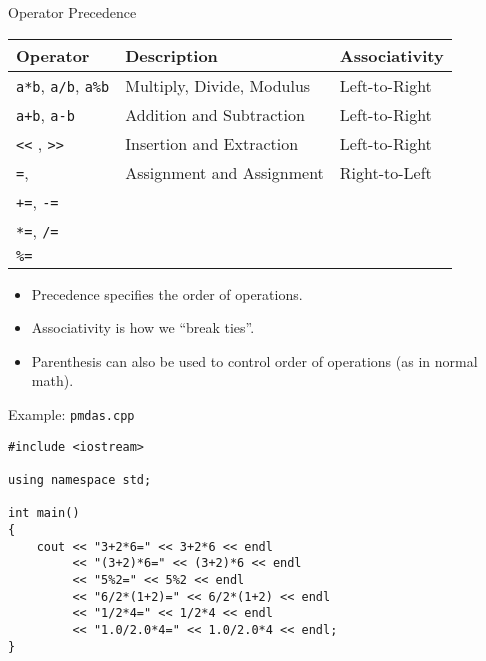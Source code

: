 \documentclass[]{beamer}
\begin{document}
\begin{frame}{Operator Precedence}
    \begin{tabular}{|l|l|l|}
        \hline
        \textbf{Operator} & \textbf{Description} & \textbf{Associativity} \\
        \hline
        \texttt{a*b}, \texttt{a/b}, \texttt{a\%b} & Multiply, Divide, Modulus & Left-to-Right\\
        \hline
        \texttt{a+b}, \texttt{a-b} & Addition and Subtraction & Left-to-Right\\
        \hline
        \texttt{<<} , \texttt{>>} & Insertion and Extraction & Left-to-Right \\
        \hline
        \texttt{=},  & Assignment and Assignment & Right-to-Left \\
        \texttt{+=}, \texttt{-=} & & \\
        \texttt{*=}, \texttt{/=} & & \\
        \texttt{\%=} & & \\
        \hline
    \end{tabular}

    \begin{itemize}[<+->]
        \item Precedence specifies the order of operations.
        \item Associativity is how we ``break ties''.
        \item Parenthesis can also be used to control order of
            operations (as in normal math).
    \end{itemize}
\end{frame}


\begin{frame}[fragile]{Example: \texttt{pmdas.cpp}}
    \begin{adjustbox}{max height=0.8\textheight}
    \begin{BVerbatim}
#include <iostream>

using namespace std;

int main()
{
    cout << "3+2*6=" << 3+2*6 << endl
         << "(3+2)*6=" << (3+2)*6 << endl
         << "5%
         << "6/2*(1+2)=" << 6/2*(1+2) << endl
         << "1/2*4=" << 1/2*4 << endl
         << "1.0/2.0*4=" << 1.0/2.0*4 << endl;
}
    \end{BVerbatim}
    \end{adjustbox}
\end{frame}
\end{document}
